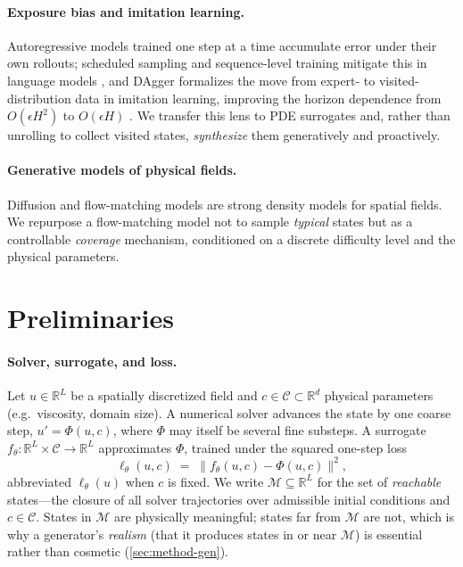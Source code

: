 \documentclass{article}
\theoremstyle{plain}
\theoremstyle{definition}
\theoremstyle{remark}
\newcommand{\R}{\mathbb{R}}
\newcommand{\state}{u}
\newcommand{\param}{c}
\newcommand{\manifold}{\mathcal{M}}
\newcommand{\sol}{\Phi}
\newcommand{\surr}{f_\theta}
\newcommand{\lossf}{\ell_\theta}
\begin{document}
\paragraph{Exposure bias and imitation learning.}
Autoregressive models trained one step at a time accumulate error under their own rollouts; scheduled
sampling and sequence-level training mitigate this in language models
\citep{bengio2015scheduled,ranzato2016sequence}, and DAgger formalizes the move from expert- to
visited-distribution data in imitation learning, improving the horizon dependence from $O(\epsilon H^2)$
to $O(\epsilon H)$ \citep{ross2011dagger}. We transfer this lens to PDE surrogates and, rather than
unrolling to collect visited states, \emph{synthesize} them generatively and proactively.

\paragraph{Generative models of physical fields.}
Diffusion and flow-matching models \citep{ho2020ddpm,lipman2023flow} are strong density models for
spatial fields. We repurpose a flow-matching model not to sample \emph{typical} states but as a
controllable \emph{coverage} mechanism, conditioned on a discrete difficulty level and the physical
parameters.

\section{Preliminaries}\label{sec:prelim}
\paragraph{Solver, surrogate, and loss.}
Let $\state\in\R^{L}$ be a spatially discretized field and $\param\in\mathcal{C}\subset\R^{d}$ physical
parameters (e.g.\ viscosity, domain size). A numerical solver advances the state by one coarse step,
$\state'=\sol(\state,\param)$, where $\sol$ may itself be several fine substeps. A surrogate
$\surr:\R^{L}\times\mathcal{C}\to\R^{L}$ approximates $\sol$, trained under the squared one-step loss
\begin{equation}
  \lossf(\state,\param)\;=\;\bigl\|\surr(\state,\param)-\sol(\state,\param)\bigr\|^{2},
\end{equation}
abbreviated $\lossf(\state)$ when $\param$ is fixed. We write $\manifold\subseteq\R^{L}$ for the set of
\emph{reachable} states---the closure of all solver trajectories over admissible initial conditions and
$\param\in\mathcal{C}$. States in $\manifold$ are physically meaningful; states far from $\manifold$ are
not, which is why a generator's \emph{realism} (that it produces states in or near $\manifold$) is
essential rather than cosmetic (\cref{sec:method-gen}).
\end{document}
